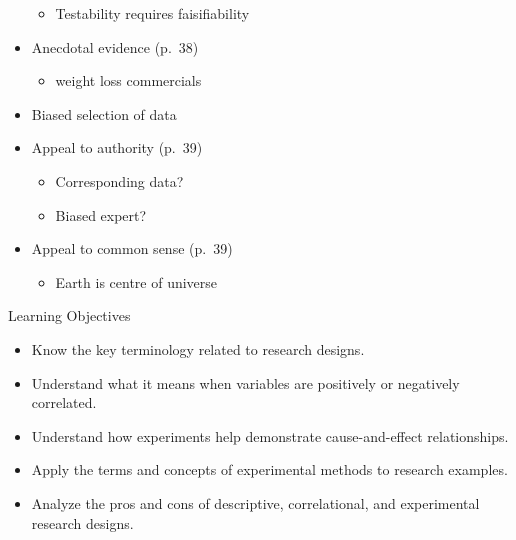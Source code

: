 \documentclass[
]{book}
\providecommand{\tightlist}{%
  \setlength{\itemsep}{0pt}\setlength{\parskip}{0pt}}
\begin{document}
\begin{reflect}
\begin{itemize}
  \begin{itemize}
  \tightlist
  \item
    Testability requires faisifiability\\
  \end{itemize}
\item
  Anecdotal evidence (p.~38)

  \begin{itemize}
  \tightlist
  \item
    weight loss commercials\\
  \end{itemize}
\item
  Biased selection of data\\
\item
  Appeal to authority (p.~39)

  \begin{itemize}
  \tightlist
  \item
    Corresponding data?\\
  \item
    Biased expert?\\
  \end{itemize}
\item
  Appeal to common sense (p.~39)

  \begin{itemize}
  \tightlist
  \item
    Earth is centre of universe
  \end{itemize}
\end{itemize}

Learning Objectives

\begin{itemize}
\tightlist
\item
  Know the key terminology related to research designs.\\
\item
  Understand what it means when variables are positively or negatively correlated.\\
\item
  Understand how experiments help demonstrate cause-and-effect relationships.\\
\item
  Apply the terms and concepts of experimental methods to research examples.\\
\item
  Analyze the pros and cons of descriptive, correlational, and experimental research designs.
\end{itemize}


\end{reflect}
\end{document}
